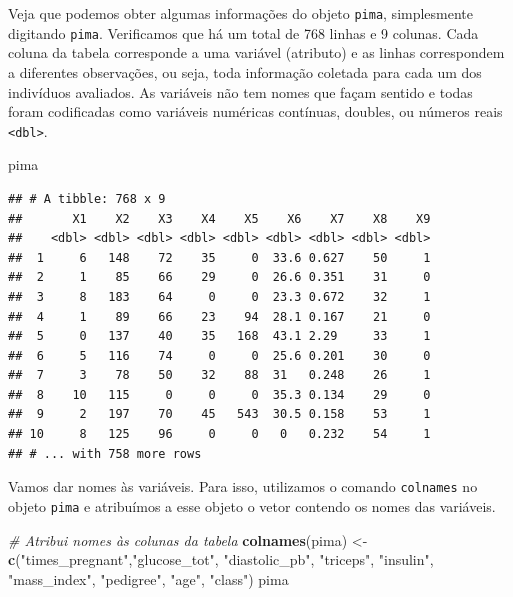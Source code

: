 \documentclass[
]{book}
\newenvironment{Shaded}{\begin{snugshade}}{\end{snugshade}}
\newcommand{\CommentTok}[1]{\textcolor[rgb]{0.56,0.35,0.01}{\textit{#1}}}
\newcommand{\KeywordTok}[1]{\textcolor[rgb]{0.13,0.29,0.53}{\textbf{#1}}}
\newcommand{\NormalTok}[1]{#1}
\newcommand{\StringTok}[1]{\textcolor[rgb]{0.31,0.60,0.02}{#1}}
\theoremstyle{definition}
\theoremstyle{definition}
\theoremstyle{definition}
\theoremstyle{remark}
\begin{document}
Veja que podemos obter algumas informações do objeto \texttt{pima}, simplesmente digitando \texttt{pima}. Verificamos que há um total de 768 linhas e 9 colunas. Cada coluna da tabela corresponde a uma variável (atributo) e as linhas correspondem a diferentes observações, ou seja, toda informação coletada para cada um dos indivíduos avaliados. As variáveis não tem nomes que façam sentido e todas foram codificadas como variáveis numéricas contínuas, doubles, ou números reais \texttt{\textless{}dbl\textgreater{}}.

\begin{Shaded}
\begin{Highlighting}[]
\NormalTok{pima}
\end{Highlighting}
\end{Shaded}

\begin{verbatim}
## # A tibble: 768 x 9
##       X1    X2    X3    X4    X5    X6    X7    X8    X9
##    <dbl> <dbl> <dbl> <dbl> <dbl> <dbl> <dbl> <dbl> <dbl>
##  1     6   148    72    35     0  33.6 0.627    50     1
##  2     1    85    66    29     0  26.6 0.351    31     0
##  3     8   183    64     0     0  23.3 0.672    32     1
##  4     1    89    66    23    94  28.1 0.167    21     0
##  5     0   137    40    35   168  43.1 2.29     33     1
##  6     5   116    74     0     0  25.6 0.201    30     0
##  7     3    78    50    32    88  31   0.248    26     1
##  8    10   115     0     0     0  35.3 0.134    29     0
##  9     2   197    70    45   543  30.5 0.158    53     1
## 10     8   125    96     0     0   0   0.232    54     1
## # ... with 758 more rows
\end{verbatim}

Vamos dar nomes às variáveis. Para isso, utilizamos o comando \texttt{colnames} no objeto \texttt{pima} e atribuímos a esse objeto o vetor contendo os nomes das variáveis.

\begin{Shaded}
\begin{Highlighting}[]
\CommentTok{# Atribui nomes às colunas da tabela}
\KeywordTok{colnames}\NormalTok{(pima) <-}\StringTok{ }\KeywordTok{c}\NormalTok{(}\StringTok{"times_pregnant"}\NormalTok{,}\StringTok{"glucose_tot"}\NormalTok{, }\StringTok{"diastolic_pb"}\NormalTok{,}
                    \StringTok{"triceps"}\NormalTok{, }\StringTok{"insulin"}\NormalTok{, }\StringTok{"mass_index"}\NormalTok{, }\StringTok{"pedigree"}\NormalTok{,}
                    \StringTok{"age"}\NormalTok{, }\StringTok{"class"}\NormalTok{)}
\NormalTok{pima}
\end{Highlighting}
\end{Shaded}
\end{document}
